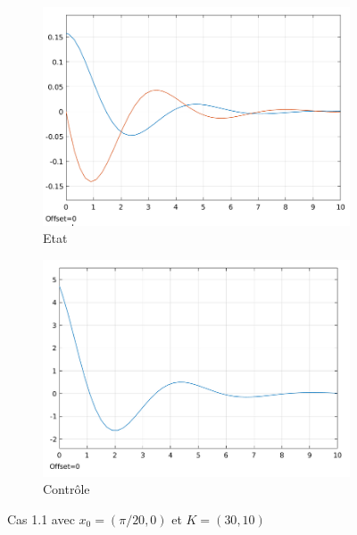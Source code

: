 \documentclass[a4paper]{article}
\begin{document}
                        \begin{figure}[h!]
                            \centering
                            \begin{subfigure}[b]{0.45\textwidth}
                                \includegraphics[width=\textwidth]{images/courbe_cas_1_1_TP02.png}
                                \caption{Etat}
                                \label{fig3.1.1}
                            \end{subfigure}
                            \hspace{30pt}
                            \begin{subfigure}[b]{0.45\textwidth}
                                \includegraphics[width=\textwidth]{images/controle_cas_1_1_TP02.png}
                                \caption{Contrôle}
                                \label{fig3.1.2}
                            \end{subfigure}
                            \caption{Cas 1.1 avec $x_0=(\pi/20, 0)$ et $K=(30,10)$}
                            \label{fig3.1}
                        \end{figure} \\
\end{document}
